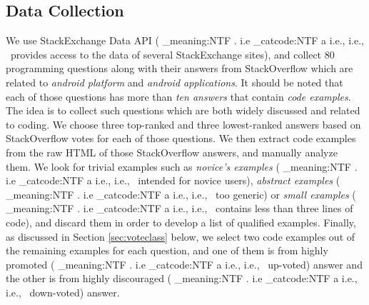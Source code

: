 \documentclass[conference]{IEEEtran}
\makeatletter
\newcommand\latinabbrev[1]{
  \peek_meaning:NTF . {%
    #1\@}%
  { \peek_catcode:NTF a {%
      #1., \@ }%
    {#1., \@}}}
\def\eg{\latinabbrev{e.g}}
\def\ie{\latinabbrev{i.e}}
\makeatother
\begin{document}
\subsection{Data Collection}
We use StackExchange Data API \cite{api} (\ie\ provides access to the data of several StackExchange sites), and collect 80 programming questions along with their answers from StackOverflow which are related to \emph{android platform} and \emph{android applications}.
It should be noted that each of those questions has more than \emph{ten answers} that contain \emph{code examples}. The idea is to collect such questions which are both widely discussed and related to coding. 
We choose three top-ranked and three lowest-ranked answers based on StackOverflow votes for each of those questions. We then extract code examples from the raw HTML of those StackOverflow answers, and manually analyze them.
We look for trivial examples such as \emph{novice's examples} (\ie\ intended for novice users), \emph{abstract examples} (\ie\ too generic) or \emph{small examples} (\ie\ contains less than three lines of code), and discard them in order to develop a list of qualified examples. 
Finally, as discussed in Section \ref{sec:voteclass} below, we select two code examples out of the remaining examples for each question, and one of them is from highly promoted (\ie\ up-voted) answer and the other is from highly discouraged (\ie\ down-voted) answer.

\vspace{-.1cm}
\end{document}
